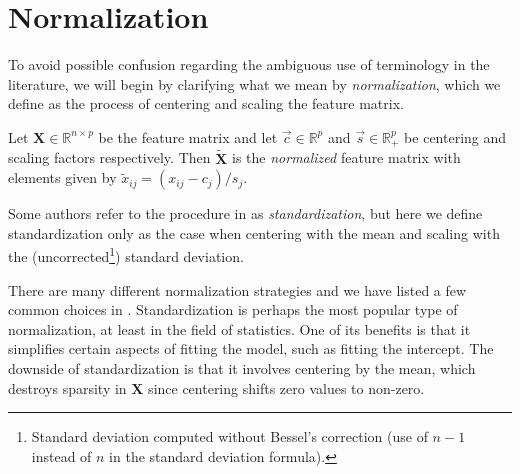 \section{Normalization}
To avoid possible confusion regarding the ambiguous use of terminology in the literature,
we will begin by clarifying what we mean by \emph{normalization}, which we define as the
process of centering and scaling the feature matrix.

\begin{definition}[Normalization]
  \label{def:normalization}
  Let \(\bm{X} \in \mathbb{R}^{n\times p}\) be the feature matrix and let
  \(\vec{c} \in \mathbb{R}^p\) and \(\vec{s} \in \mathbb{R}^p_+\) be centering
  and scaling factors respectively. Then \(\tilde{\bm{X}}\) is the
  \emph{normalized} feature matrix with elements given by
  \(\tilde{x}_{ij} = (x_{ij} - c_j)/s_j\).
\end{definition}

Some authors refer to the procedure in  as \emph{standardization},
but here we define standardization only as the case when centering with the mean and
scaling with the (uncorrected\footnote{Standard deviation computed without Bessel's
  correction (use of \(n-1\) instead of \(n\) in the standard deviation formula).}) standard
deviation.

There are many different normalization strategies and we have listed a few common choices
in . Standardization is perhaps the most popular type of
normalization, at least in the field of statistics. One of its benefits is that it
simplifies certain aspects of fitting the model, such as fitting the intercept. The
downside of standardization is that it involves centering by the mean, which destroys
sparsity in \(\bm{X}\) since centering shifts zero values to non-zero.

